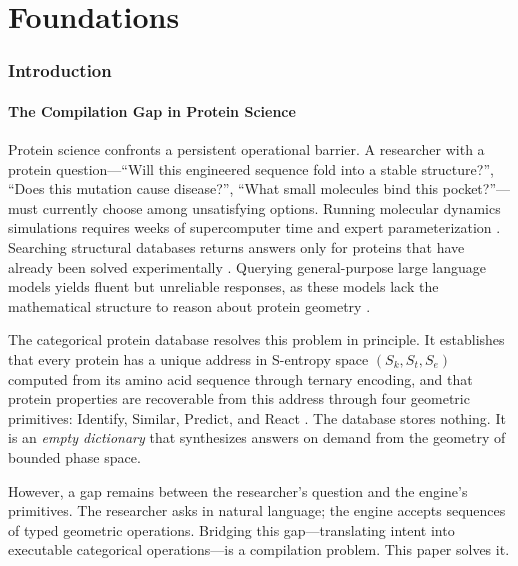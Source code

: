 \documentclass[11pt,twocolumn,a4paper]{article}
\theoremstyle{definition}
\theoremstyle{remark}
\newcommand{\Sk}{S_k}
\newcommand{\St}{S_t}
\newcommand{\Se}{S_e}
\begin{document}
\part{Foundations}

\section{Introduction}
\label{sec:introduction}

\subsection{The Compilation Gap in Protein Science}

Protein science confronts a persistent operational barrier. A researcher with a protein question---``Will this engineered sequence fold into a stable structure?'', ``Does this mutation cause disease?'', ``What small molecules bind this pocket?''---must currently choose among unsatisfying options. Running molecular dynamics simulations requires weeks of supercomputer time and expert parameterization \citep{karplus2002}. Searching structural databases returns answers only for proteins that have already been solved experimentally \citep{berman2000}. Querying general-purpose large language models yields fluent but unreliable responses, as these models lack the mathematical structure to reason about protein geometry \citep{rives2021}.

The categorical protein database \citep{sachikonye2025c} resolves this problem in principle. It establishes that every protein has a unique address in S-entropy space $(\Sk, \St, \Se)$ computed from its amino acid sequence through ternary encoding, and that protein properties are recoverable from this address through four geometric primitives: Identify, Similar, Predict, and React \citep{sachikonye2025a}. The database stores nothing. It is an \emph{empty dictionary} that synthesizes answers on demand from the geometry of bounded phase space.

However, a gap remains between the researcher's question and the engine's primitives. The researcher asks in natural language; the engine accepts sequences of typed geometric operations. Bridging this gap---translating intent into executable categorical operations---is a compilation problem. This paper solves it.
\end{document}
